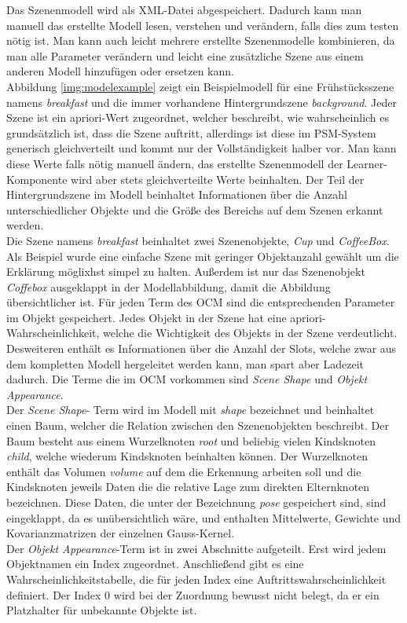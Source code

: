 Das Szenenmodell wird als XML-Datei abgespeichert. Dadurch kann man manuell das erstellte Modell lesen, verstehen und verändern, falls dies zum testen nötig ist. Man kann auch leicht mehrere erstellte Szenenmodelle kombinieren, da man alle Parameter verändern und leicht eine zusätzliche Szene aus einem anderen Modell hinzufügen oder ersetzen kann. \cite{hosc99}\smallskip\\ 
Abbildung \ref{img:modelexample} zeigt ein Beispielmodell für eine Frühstücksszene namens \textit{breakfast} und die immer vorhandene Hintergrundszene \textit{background}. Jeder Szene ist ein apriori-Wert zugeordnet, welcher beschreibt, wie wahrscheinlich es grundsätzlich ist, dass die Szene auftritt, allerdings ist diese im PSM-System generisch gleichverteilt und kommt nur der Vollständigkeit halber vor. Man kann diese Werte falls nötig manuell ändern, das erstellte Szenenmodell der Learner-Komponente wird aber stets gleichverteilte Werte beinhalten. Der Teil der Hintergrundszene im Modell beinhaltet Informationen über die Anzahl unterschiedlicher Objekte und die Größe des Bereichs auf dem Szenen erkannt werden.\smallskip\\
Die Szene namens \textit{breakfast} beinhaltet zwei Szenenobjekte, \textit{Cup} und \textit{CoffeeBox}. Als Beispiel wurde eine einfache Szene mit geringer Objektanzahl gewählt um die Erklärung möglixhst simpel zu halten. Außerdem ist nur das Szenenobjekt \textit{Coffebox} ausgeklappt in der Modellabbildung, damit die Abbildung übersichtlicher ist. Für jeden Term des OCM sind die entsprechenden Parameter im Objekt gespeichert. Jedes Objekt in der Szene hat eine apriori-Wahrscheinlichkeit, welche die Wichtigkeit des Objekts in der Szene verdeutlicht. Desweiteren enthält es Informationen über die Anzahl der Slots, welche zwar aus dem kompletten Modell hergeleitet werden kann, man spart aber Ladezeit dadurch. Die Terme die im OCM vorkommen sind \textit{Scene Shape} und \textit{Objekt Appearance}.\smallskip\\
Der \textit{Scene Shape}- Term wird im Modell mit \textit{shape} bezeichnet und beinhaltet einen Baum, welcher die Relation zwischen den Szenenobjekten beschreibt. Der Baum besteht aus einem Wurzelknoten \textit{root} und beliebig vielen Kindsknoten \textit{child}, welche wiederum Kindsknoten beinhalten können. Der Wurzelknoten enthält das Volumen \textit{volume} auf dem die Erkennung arbeiten soll und die Kindsknoten jeweils Daten die die relative Lage zum direkten Elternknoten bezeichnen. Diese Daten, die unter der Bezeichnung \textit{pose} gespeichert sind, sind eingeklappt, da es unübersichtlich wäre, und enthalten Mittelwerte, Gewichte und Kovarianzmatrizen der einzelnen Gauss-Kernel.\smallskip\\
Der \textit{Objekt Appearance}-Term ist in zwei Abschnitte aufgeteilt. Erst wird jedem Objektnamen ein Index zugeordnet. Anschließend gibt es eine Wahrscheinlichkeitstabelle, die für jeden Index eine Auftrittswahrscheinlichkeit definiert. Der Index 0 wird bei der Zuordnung bewusst nicht belegt, da er ein Platzhalter für unbekannte Objekte ist.
\cite{gehrung14}

